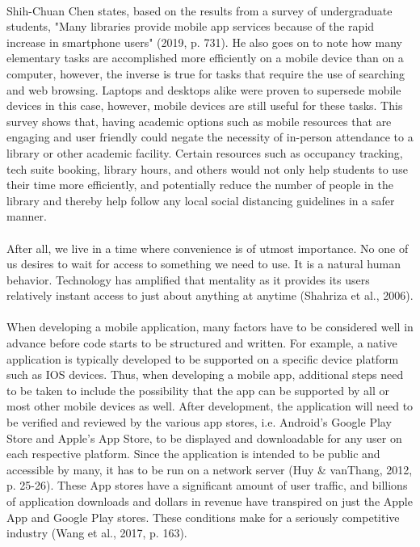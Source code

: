 \paragraph{}
 Shih-Chuan Chen states, based on the results from a survey of undergraduate students, "Many libraries provide mobile app services because of the rapid increase in smartphone users" (2019, p. 731). He also goes on to note how many elementary tasks are accomplished more efficiently on a mobile device than on a computer, however, the inverse is true for tasks that require the use of searching and web browsing. Laptops and desktops alike were proven to supersede mobile devices in this case, however, mobile devices are still useful for these tasks. This survey shows that, having academic options such as mobile resources that are engaging and user friendly could negate the necessity of in-person attendance to a library or other academic facility. Certain resources such as occupancy tracking, tech suite booking, library hours, and others would not only help students to use their time more efficiently, and potentially reduce the number of people in the library and thereby help follow any local social distancing guidelines in a safer manner.
 
 \paragraph{}
 After all, we live in a time where convenience is of utmost importance. No one of us desires to wait for access to something we need to use. It is a natural human behavior. Technology has amplified that mentality as it provides its users relatively instant access to just about anything at anytime (Shahriza et al., 2006).

\paragraph{}
When developing a mobile application, many factors have to be considered well in advance before code starts to be structured and written. For example, a native application is typically developed to be supported on a specific device platform such as IOS devices. Thus, when developing a mobile app, additional steps need to be taken to include the possibility that the app can be supported by all or most other mobile devices as well. After development, the application will need to be verified and reviewed by the various app stores, i.e. Android's Google Play Store and Apple's App Store, to be displayed and downloadable for any user on each respective platform. Since the application is intended to be public and accessible by many, it has to be run on a network server (Huy \& vanThang, 2012, p. 25-26). These App stores have a significant amount of user traffic, and billions of application downloads and dollars in revenue have transpired on just the Apple App and Google Play stores. These conditions make for a seriously competitive industry (Wang et al., 2017, p. 163).

